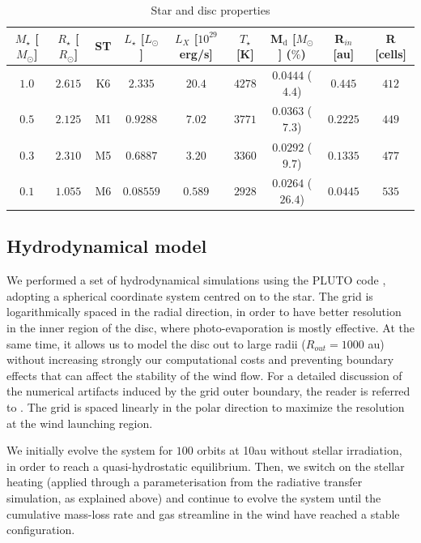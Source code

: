 \documentclass{aa}
\begin{document}
\begin{table}
\caption{Star and disc properties}
\label{tab:stars}
\centering
\begin{tabular}{c c c c c c c c c}
\hline
$M_\star$ [$M_\odot$] & $R_\star$ [$R_\odot$] & ST & $L_\star$ [$L_\odot$] & $L_X$ [$10^{29}$ erg/s] & $T_\star$ [K] & M$_\mathrm{d}$ [$M_\odot$] ($\%$) & R$_{in}$ [au] & R [cells]\\
\hline
\hline
   $1.0$ & $2.615$ & K6 & $2.335$ & $20.4$ & $4278$ & $0.0444$ ($4.4$) & $0.445$ & $412$\\
   $0.5$ & $2.125$ & M1 & $0.9288$ & $7.02$ & $3771$ & $0.0363$ ($7.3$) & $0.2225$ & $449$\\
   $0.3$ & $2.310$ & M5 & $0.6887$ & $3.20$ & $3360$ & $0.0292$ ($9.7$) & $0.1335$ & $477$\\
   $0.1$ & $1.055$ & M6 & $0.08559$ & $0.589$ & $2928$ & $0.0264$ ($26.4$) & $0.0445$ & $535$\\
\hline
\end{tabular}
\end{table}

\subsection{Hydrodynamical model}

We performed a set of hydrodynamical simulations using the \textsc{PLUTO} code , adopting a spherical coordinate system centred on to the star.
The grid is logarithmically spaced in the radial direction, in order to have better resolution in the inner region of the disc, where photo-evaporation is mostly effective.
At the same time, it allows us to model the disc out to large radii ($R_{out}= 1000$ au) without increasing strongly our computational costs and preventing boundary effects that can affect the stability of the wind flow.
For a detailed discussion of the numerical artifacts induced by the grid outer boundary, the reader is referred to .
The grid is spaced linearly in the polar direction to maximize the resolution at the wind launching region.

We initially evolve the system for $100$ orbits at \si{10}{au} without stellar irradiation, in order to reach a quasi-hydrostatic equilibrium.
Then, we switch on the stellar heating (applied through a parameterisation from the radiative transfer simulation, as explained above) and continue to evolve the system until the cumulative mass-loss rate and gas streamline in the wind have reached a stable configuration.
\end{document}
